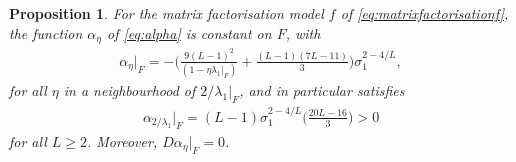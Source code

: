 \documentclass{article}
\theoremstyle{plain}
\newtheorem{proposition}[theorem]{Proposition}
\theoremstyle{definition}
\theoremstyle{remark}
\begin{document}
\begin{proposition}
    For the matrix factorisation model $f$ of \eqref{eq:matrixfactorisationf}, the function $\alpha_{\eta}$ of \eqref{eq:alpha} is constant on $F$, with
    \begin{align}
    \alpha_{\eta}|_{F} = -\bigg(\frac{9(L-1)^2}{(1-\eta\lambda_1|_{F})} + \frac{(L-1)(7L-11)}{3}\bigg)\sigma_1^{2-4/L},
    \end{align}
    for all $\eta$ in a neighbourhood of $2/\lambda_1|_{F}$, and in particular satisfies
    \begin{align}
    \alpha_{2/\lambda_1}|_{F} = (L-1)\sigma_1^{2-4/L}\bigg(\frac{20L-16}{3}\bigg) >0
    \end{align}
    for all $L\geq 2$. Moreover, $D\alpha_{\eta}|_{F} = 0$.
\end{proposition}
\end{document}
